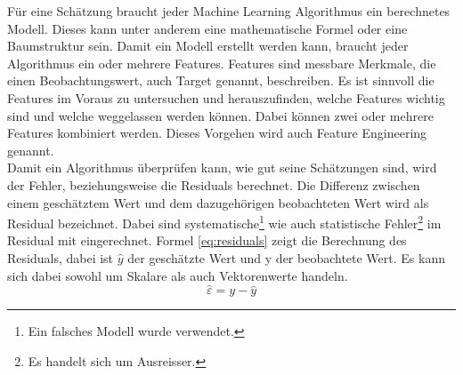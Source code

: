 %
Für eine Schätzung braucht jeder Machine Learning Algorithmus ein berechnetes Modell. Dieses kann unter anderem eine mathematische Formel oder eine Baumstruktur sein. Damit ein Modell erstellt werden kann, braucht jeder Algorithmus ein oder mehrere Features. Features sind messbare Merkmale, die einen Beobachtungswert, auch Target genannt, beschreiben. Es ist sinnvoll die Features im Voraus zu untersuchen und herauszufinden, welche Features wichtig sind und welche weggelassen werden können. Dabei können zwei oder mehrere Features kombiniert werden. Dieses Vorgehen wird auch Feature Engineering genannt.\\[2ex]
%
Damit ein Algorithmus überprüfen kann, wie gut seine Schätzungen sind, wird der Fehler, beziehungsweise die Residuals berechnet. Die Differenz zwischen einem geschätztem Wert und dem dazugehörigen beobachteten Wert wird als Residual bezeichnet. Dabei sind systematische\footnote{Ein falsches Modell wurde verwendet.} wie auch statistische Fehler\footnote{Es handelt sich um Ausreisser.} im Residual mit  eingerechnet. Formel \eqref{eq:residuals} zeigt die Berechnung des Residuals, dabei ist $\hat{y}$ der geschätzte Wert und y der beobachtete Wert. Es kann sich dabei sowohl um Skalare als auch Vektorenwerte handeln.\\
\begin{equation}
\label{eq:residuals}
\hat{\varepsilon} = y - \hat{y}
\end{equation}
%
\begin{table}[hb]
\centering
{}
\caption{Fehlermodelle mit Formelen}
\label{tab:error_models}
\end{table}
